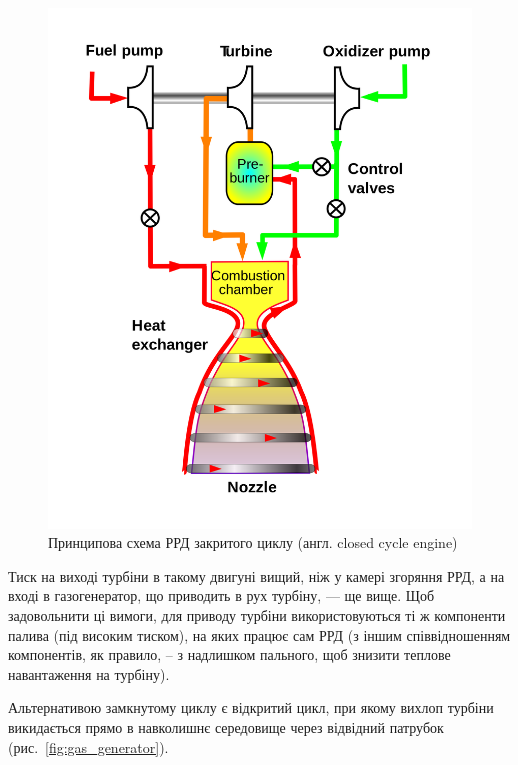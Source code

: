 \begin{figure}
    \centering
    \includegraphics[width=0.35\textheight, angle=0,origin=c]{chapter_1/Staged_combustion_rocket_cycle.svg.png}
    \caption{Принципова схема РРД закритого циклу (англ. closed cycle engine)}
    \label{fig:closed_cycle}
\end{figure}

Тиск на виході турбіни в такому двигуні вищий, ніж у камері згоряння РРД, а на вході в газогенератор, що приводить в рух турбіну, --- ще вище. Щоб задовольнити ці вимоги, для приводу турбіни використовуються ті ж компоненти палива (під високим тиском), на яких працює сам РРД (з іншим співвідношенням компонентів, як правило, -- з надлишком пального, щоб знизити теплове навантаження на турбіну).

Альтернативою замкнутому циклу є відкритий цикл, при якому вихлоп турбіни викидається прямо в навколишнє середовище через відвідний патрубок (рис.~\ref{fig:gas_generator}).

